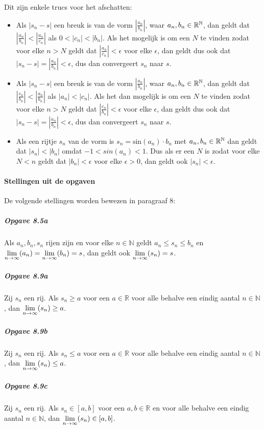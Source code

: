 \noindent Dit zijn enkele trucs voor het afschatten:
\begin{itemize}
    \setlength\itemsep{0em}
    \item Als $|s_{n}-s|$ een breuk is van de vorm $|\frac{a_{n}}{b_{n}}|$, waar $a_{n},b_{n}\in\mathbb{R}^{\mathbb{N}}$, dan geldt dat $|\frac{a_{n}}{b_{n}}|<|\frac{a_{n}}{c_{n}}|$  als $0<|c_{n}|<|b_{n}|$. Als het mogelijk is om een $N$ te vinden zodat voor elke $n>N$ geldt dat $|\frac{a_{n}}{c_{n}}|<\epsilon$ voor elke $\epsilon$, dan geldt dus ook dat $|s_{n}-s|=|\frac{a_{n}}{b_{n}}|<\epsilon$, dus dan convergeert $s_{n}$ naar $s$.
    \item Als $|s_{n}-s|$ een breuk is van de vorm $|\frac{a_{n}}{b_{n}}|$, waar $a_{n},b_{n}\in\mathbb{R}^{\mathbb{N}}$, dan geldt dat $|\frac{c_{n}}{b_{n}}|<|\frac{a_{n}}{b_{n}}|$ als  $|a_{n}|<|c_{n}|$. Als het dan mogelijk is om een $N$ te vinden zodat voor elke $n>N$ geldt dat $|\frac{c_{n}}{b_{n}}|<\epsilon$ voor elke $\epsilon$, dan geldt dus ook dat $|s_{n}-s|=|\frac{a_{n}}{b_{n}}|<\epsilon$, dus dan convergeert $s_{n}$ naar $s$.
    \item Als een rijtje $s_{n}$ van de vorm is $s_{n}=\text{sin}(a_{n}) \cdot b_{n}$ met $a_{n},b_{n}\in\mathbb{R}^{\mathbb{N}}$ dan geldt dat $|s_{n}|<|b_{n}|$ omdat $-1<sin(a_{n})<1$. Dus als er een $N$ is zodat voor elke $N<n$ geldt dat $|b_{n}|<\epsilon$ voor elke $\epsilon>0$, dan geldt ook $|s_{n}|<\epsilon$.
\end{itemize}

\paragraph{Stellingen uit de opgaven} De volgende stellingen worden bewezen in paragraaf $8$:

\subparagraph{Opgave 8.5a} Als $a_{n},b_{n},s_{n}$ rijen zijn en voor elke $n\in\mathbb{N}$ geldt $a_{n} \leq s_{n} \leq b_{n}$ en\\ $\underset{n\to\infty}{\text{lim}}(a_{n})=\underset{n\to\infty}{\text{lim}}(b_{n})=s$, dan geldt ook $\underset{n\to\infty}{\text{lim}}(s_{n})=s$.

\subparagraph{Opgave 8.9a} Zij $s_{n}$ een rij. Als $s_{n} \geq a$ voor een $a\in\mathbb{R}$ voor alle behalve een eindig aantal $n\in\mathbb{N}$, dan $\underset{n\to\infty}{\text{lim}}(s_{n}) \geq a$.

\subparagraph{Opgave 8.9b} Zij $s_{n}$ een rij. Als $s_{n} \leq a$ voor een $a\in\mathbb{R}$ voor alle behalve een eindig aantal $n\in\mathbb{N}$, dan $\underset{n\to\infty}{\text{lim}}(s_{n}) \leq a$.

\subparagraph{Opgave 8.9c} Zij $s_{n}$ een rij. Als $s_{n} \in [a,b]$ voor een $a,b\in\mathbb{R}$ en voor alle behalve een eindig aantal $n\in\mathbb{N}$, dan $\underset{n\to\infty}{\text{lim}}(s_{n}) \in [a,b]$.

